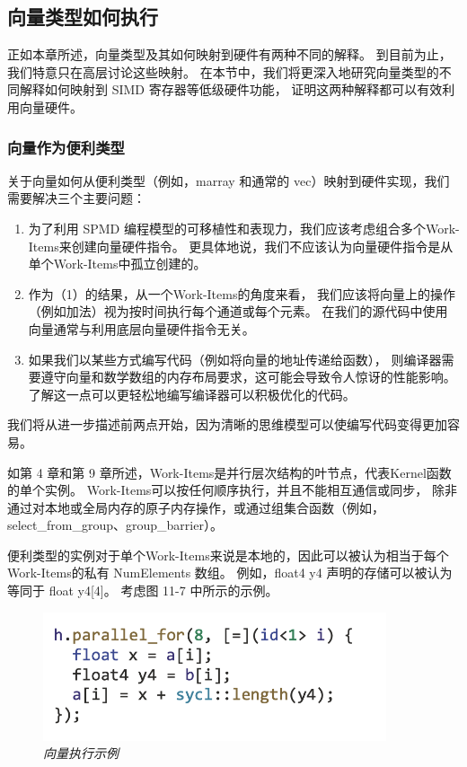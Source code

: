\subsection{向量类型如何执行}
正如本章所述，向量类型及其如何映射到硬件有两种不同的解释。 到目前为止，我们特意只在高层讨论这些映射。 
在本节中，我们将更深入地研究向量类型的不同解释如何映射到 SIMD 寄存器等低级硬件功能，
证明这两种解释都可以有效利用向量硬件。

\subsubsection{向量作为便利类型}
关于向量如何从便利类型（例如，marray 和通常的 vec）映射到硬件实现，我们需要解决三个主要问题：

\begin{enumerate}
	\item 为了利用 SPMD 编程模型的可移植性和表现力，我们应该考虑组合多个Work-Items来创建向量硬件指令。 
	更具体地说，我们不应该认为向量硬件指令是从单个Work-Items中孤立创建的。

	\item 作为（1）的结果，从一个Work-Items的角度来看，
	我们应该将向量上的操作（例如加法）视为按时间执行每个通道或每个元素。 
	在我们的源代码中使用向量通常与利用底层向量硬件指令无关。

	\item 如果我们以某些方式编写代码（例如将向量的地址传递给函数），
	则编译器需要遵守向量和数学数组的内存布局要求，这可能会导致令人惊讶的性能影响。 
	了解这一点可以更轻松地编写编译器可以积极优化的代码。
\end{enumerate}

我们将从进一步描述前两点开始，因为清晰的思维模型可以使编写代码变得更加容易。

如第 4 章和第 9 章所述，Work-Items是并行层次结构的叶节点，代表Kernel函数的单个实例。 
Work-Items可以按任何顺序执行，并且不能相互通信或同步，
除非通过对本地或全局内存的原子内存操作，或通过组集合函数（例如，select\_from\_group、group\_barrier）。

便利类型的实例对于单个Work-Items来说是本地的，因此可以被认为相当于每个Work-Items的私有 NumElements 数组。 
例如，float4 y4 声明的存储可以被认为等同于 float y4[4]。 考虑图 11-7 中所示的示例。

\begin{figure}[H]
	\centering
	\includegraphics[width=0.9\textwidth]{figs/F11.7.png}
	\caption{\textit{向量执行示例 }}
\end{figure}

